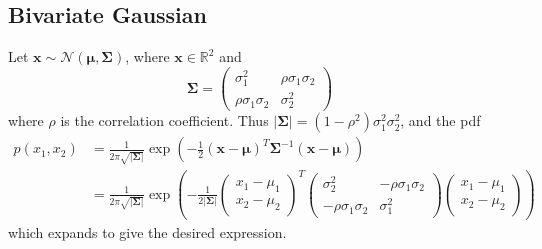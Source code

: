 \documentclass{article}
\begin{document}
\subsection{Bivariate Gaussian}
Let $\bm{x} \sim \mathcal{N}(\bm{\mu}, \bm{\Sigma})$, where $\bm{x} \in \mathbb{R}^2$ and
\begin{equation*}
\bm{\Sigma} = \begin{pmatrix} \sigma_1^2 & \rho\sigma_1\sigma_2 \\ \rho\sigma_1\sigma_2 & \sigma_2^2 \end{pmatrix}
\end{equation*}
where $\rho$ is the correlation coefficient. Thus $|\bm{\Sigma}| = (1-\rho^2)\sigma_1^2\sigma_2^2$, and the pdf
\begin{align*}
p(x_1,x_2) &= \frac{1}{2\pi\sqrt{|\bm{\Sigma}|}} \exp(-\frac{1}{2} (\bm{x}-\bm{\mu})^T \bm{\Sigma}^{-1} (\bm{x}-\bm{\mu}))\\
&= \frac{1}{2\pi\sqrt{|\bm{\Sigma}|}} \exp\left( -\frac{1}{2|\bm{\Sigma}|} \begin{pmatrix}x_1-\mu_1\\x_2-\mu_2\end{pmatrix}^T \begin{pmatrix}\sigma_2^2&-\rho\sigma_1\sigma_2\\-\rho\sigma_1\sigma_2&\sigma_1^2\end{pmatrix} \begin{pmatrix}x_1-\mu_1\\x_2-\mu_2\end{pmatrix} \right)
\end{align*}
which expands to give the desired expression.
\end{document}
